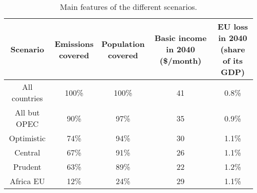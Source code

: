 \begin{table}[h]

\caption{\label{tab:scenarios_table.tex}Main features of the different scenarios.}
\centering
\begin{tabular}[t]{ccccc}
\toprule
Scenario & \makecell{Emissions\\covered} & \makecell{Population\\covered} & \makecell{Basic income\\in 2040 (\$/month)} & \makecell{EU loss in 2040\\(share of its GDP)}\\
\midrule
All countries & 100\% & 100\% & 41 & 0.8\%\\
All but OPEC & 90\% & 97\% & 35 & 0.9\%\\
Optimistic & 74\% & 94\% & 30 & 1.1\%\\
Central & 67\% & 91\% & 26 & 1.1\%\\
Prudent & 63\% & 89\% & 22 & 1.2\%\\
Africa EU & 12\% & 24\% & 29 & 1.1\%\\
\bottomrule
\end{tabular}
\end{table}